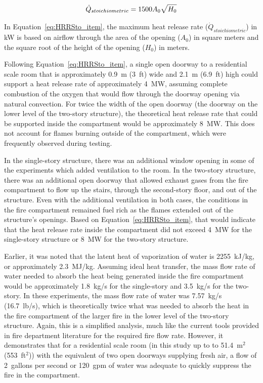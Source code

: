 \documentclass[12pt,oneside]{book}
\begin{document}
\begin{equation} \label{eq:HRRSto_item}
\dot{Q}_{stoichiometric} = 1500 A_0 \sqrt{H_0} \\
\end{equation}

In Equation~\ref{eq:HRRSto_item}, the maximum heat release rate ($\dot{Q}_{stoichiometric}$) in kW is based on airflow through the area of the opening ($A_0$) in square meters and the square root of the height of the opening ($H_0$) in meters.  

Following Equation~\ref{eq:HRRSto_item}, a single open doorway to a residential scale room that is approximately 0.9~m (3~ft) wide and 2.1~m (6.9~ft) high could support a heat release rate of approximately 4~MW, assuming complete combustion of the oxygen that would flow through the doorway opening via natural convection. For twice the width of the open doorway (the doorway on the lower level of the two-story structure), the theoretical heat release rate that could be supported inside the compartment would be approximately 8~MW. This does not account for flames burning outside of the compartment, which were frequently observed during testing.  

In the single-story structure, there was an additional window opening in some of the experiments which added ventilation to the room. In the two-story structure, there was an additional open doorway that allowed exhaust gases from the fire compartment to flow up the stairs, through the second-story floor, and out of the structure. Even with the additional ventilation in both cases, the conditions in the fire compartment remained fuel rich as the flames extended out of the structure's openings. Based on Equation~\ref{eq:HRRSto_item}, that would indicate that the heat release rate inside the compartment did not exceed 4~MW for the single-story structure or 8~MW for the two-story structure. 

Earlier, it was noted that the latent heat of vaporization of water is 2255~kJ/kg, or approximately 2.3~MJ/kg. Assuming ideal heat transfer, the mass flow rate of water needed to absorb the heat being generated inside the fire compartment would be approximately 1.8~kg/s for the single-story and 3.5~kg/s for the two-story. In these experiments, the mass flow rate of water was 7.57~kg/s (16.7~lb/s), which is theoretically twice what was needed to absorb the heat in the fire compartment of the larger fire in the lower level of the two-story structure. Again, this is a simplified analysis, much like the current tools provided in fire department literature for the required fire flow rate. However, it demonstrates that for a residential scale room (in this study up to to 51.4~m$^2$ (553~ft$^2$)) with the equivalent of two open doorways supplying fresh air, a flow of 2~gallons per second or 120~gpm of water was adequate to quickly suppress the fire in the compartment.                
\end{document}
